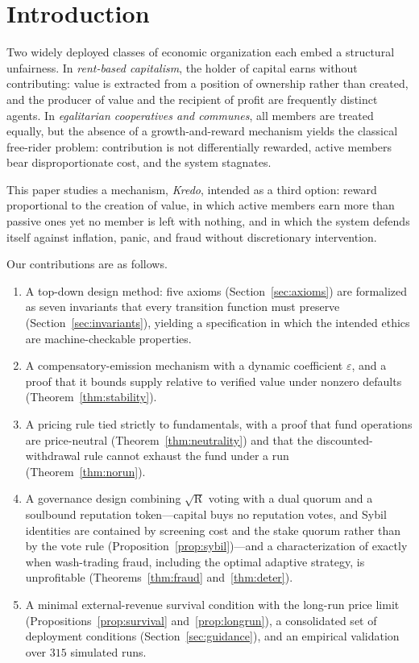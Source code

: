 \documentclass[11pt]{article}
\theoremstyle{plain}
\theoremstyle{definition}
\theoremstyle{remark}
\newcommand{\R}{\mathrm{R}}
\begin{document}
\section{Introduction}

Two widely deployed classes of economic organization each embed a structural unfairness. In \emph{rent-based capitalism}, the holder of capital earns without contributing: value is extracted from a position of ownership rather than created, and the producer of value and the recipient of profit are frequently distinct agents. In \emph{egalitarian cooperatives and communes}, all members are treated equally, but the absence of a growth-and-reward mechanism yields the classical free-rider problem: contribution is not differentially rewarded, active members bear disproportionate cost, and the system stagnates.

This paper studies a mechanism, \emph{Kredo}, intended as a third option: reward proportional to the creation of value, in which active members earn more than passive ones yet no member is left with nothing, and in which the system defends itself against inflation, panic, and fraud without discretionary intervention.

Our contributions are as follows.
\begin{enumerate}[leftmargin=*,itemsep=2pt]
    \item A top-down design method: five axioms (Section~\ref{sec:axioms}) are formalized as seven invariants that every transition function must preserve (Section~\ref{sec:invariants}), yielding a specification in which the intended ethics are machine-checkable properties.
    \item A compensatory-emission mechanism with a dynamic coefficient $\varepsilon$, and a proof that it bounds supply relative to verified value under nonzero defaults (Theorem~\ref{thm:stability}).
    \item A pricing rule tied strictly to fundamentals, with a proof that fund operations are price-neutral (Theorem~\ref{thm:neutrality}) and that the discounted-withdrawal rule cannot exhaust the fund under a run (Theorem~\ref{thm:norun}).
    \item A governance design combining $\sqrt{\R}$ voting with a dual quorum and a soulbound reputation token---capital buys no reputation votes, and Sybil identities are contained by screening cost and the stake quorum rather than by the vote rule (Proposition~\ref{prop:sybil})---and a characterization of exactly when wash-trading fraud, including the optimal adaptive strategy, is unprofitable (Theorems~\ref{thm:fraud} and~\ref{thm:deter}).
    \item A minimal external-revenue survival condition with the long-run price limit (Propositions~\ref{prop:survival} and~\ref{prop:longrun}), a consolidated set of deployment conditions (Section~\ref{sec:guidance}), and an empirical validation over $315$ simulated runs.
\end{enumerate}
\end{document}
